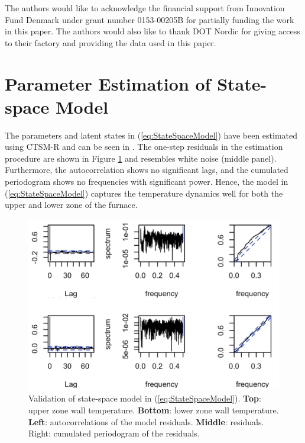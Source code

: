 \documentclass[sigconf]{acmart}
\begin{document}
% 

\begin{acks}
    The authors would like to acknowledge the financial support from Innovation Fund Denmark under grant number 0153-00205B for partially funding the work in this paper. The authors would also like to thank DOT Nordic for giving access to their factory and providing the data used in this paper.
\end{acks}






\appendix

\section{Parameter Estimation of State-space Model}\label{app:parameter-estimation}

The parameters and latent states in (\ref{eq:StateSpaceModel}) have been estimated using CTSM-R \cite{juhl2016ctsmr} and can be seen in \cite{code}. The one-step residuals in the estimation procedure are shown in Figure \ref{fig:4thOrderModelValidation} and resembles white noise (middle panel). Furthermore, the autocorrelation shows no significant lags, and the cumulated periodogram shows no frequencies with significant power. Hence, the model in (\ref{eq:StateSpaceModel}) captures the temperature dynamics well for both the upper and lower zone of the furnace.


\begin{figure}[t]
    \centering
    \includegraphics[width=\columnwidth]{figures/4thOrderModelValidation_V2.png}
    \caption{Validation of state-space model in (\ref{eq:StateSpaceModel}). \textbf{Top}: upper zone wall temperature. \textbf{Bottom}: lower zone wall temperature. \textbf{Left}: autocorrelations of the model residuals. \textbf{Middle}: residuals. \textrm{Right}: cumulated periodogram of the residuals.}
    \label{fig:4thOrderModelValidation}
\end{figure}
\end{document}
